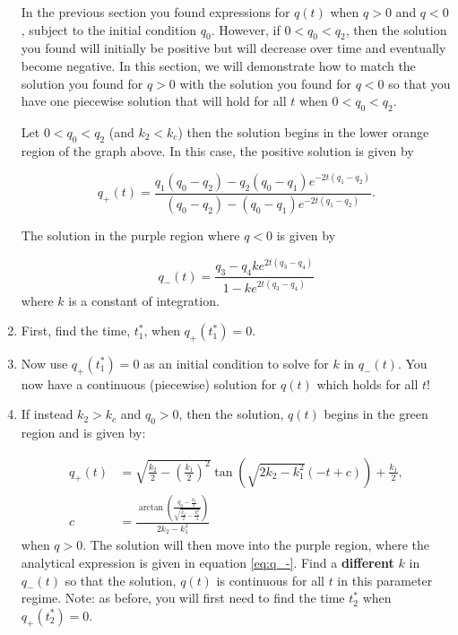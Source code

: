 \documentclass[10pt, letterpaper, answer]{exam}
\begin{document}
\begin{enumerate}
In the previous section you found expressions for $q(t)$ when $q>0$ and $q<0$, subject to the initial condition $q_0$. However, if $0<q_0<q_2$, then the solution you found will initially be positive but will decrease over time and eventually become negative. In this section, we will demonstrate how to match the solution you found for $q>0$ with the solution you found for $q<0$ so that you have one piecewise solution that will hold for all $t$ when $0<q_0<q_2$.




Let $0<q_0<q_2$ (and $k_2<k_c$) then the solution begins in the lower orange region of the graph above. In this case, the positive solution is given by 

\begin{equation}
        q_+(t) = \dfrac{q_1(q_0 - q_2) - q_2(q_0 - q_1)e^{-2t(q_1-q_2)}}{(q_0 - q_2) - (q_0 - q_1)e^{-2t(q_1-q_2)}}.
\end{equation}

The solution in the purple region where $q<0$ is given by 

    \begin{equation}
        q_-(t) = \dfrac{q_3 - q_4ke^{2t(q_3-q_4)}}{1 - ke^{2t(q_3-q_4)}} \label{eq:q_-}
    \end{equation}
where $k$ is a constant of integration.

\item First, find the time, $t_1^*$, when $q_+(t_1^*)=0$.


\item Now use $q_+(t_1^*)=0$ as an initial condition to solve for $k$ in $q_-(t)$. You now have a continuous (piecewise) solution for $q(t)$ which holds for all $t$!



\item If instead $k_2>k_c$ and $q_0>0$, then the solution, $q(t)$ begins in the green region and is given by:

\begin{align}
    q_+(t) &= \sqrt{\frac{k_2}{2} - (\frac{k_1}{2})^2}\tan(\sqrt{2k_2 - k_1^2}(-t + c)) + \frac{k_1}{2},\\
    c&=\frac{\arctan\left(\frac{q_0-\frac{k_2}{2}}{\sqrt{\frac{k_2}{2}-\frac{k_1^2}{4}}}\right)}{2k_2-k_1^2}
\end{align}
when $q>0$. The solution will then move into the purple region, where the analytical expression is given in equation \ref{eq:q_-}. Find a \textbf{different} $k$ in $q_-(t)$ so that the solution, $q(t)$ is continuous for all $t$ in this parameter regime. Note: as before, you will first need to find the time $t_2^*$ when $q_+(t_2^*)=0.$





\end{enumerate}
\end{document}
